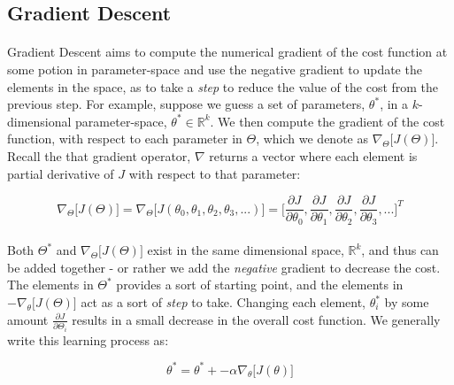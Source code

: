 \documentclass[12pt,letterpaper]{article}
\begin{document}
\subsection{Gradient Descent}

\paragraph*{}Gradient Descent aims to compute the numerical gradient of the cost function at some potion in parameter-space and use the negative gradient to update the elements in the space, as to take a \textit{step} to reduce the value of the cost from the previous step. For example, suppose we guess a set of parameters, $\theta^*$, in a $k$-dimensional parameter-space, $\theta^* \in \mathbb{R}^k$. We then compute the gradient of the cost function, with respect to each parameter in $\Theta$, which we denote as $\nabla_\Theta \big[ J(\Theta) \big]$. Recall the that gradient operator, $\nabla$ returns a vector where each element is partial derivative of $J$ with respect to that parameter:

\begin{equation}
\label{cost gradient}
\nabla_\Theta \big[ J(\Theta) \big] = \nabla_\Theta \big[ J(\theta_0, \theta_1,\theta_2,\theta_3,...) \big] =
\Big[ \frac{\partial J}{\partial \theta_0}, \frac{\partial J}{\partial \theta_1}, 
		\frac{\partial J}{\partial \theta_2}, \frac{\partial J}{\partial \theta_3}, ... \Big]^T
\end{equation}

\paragraph*{}Both $\Theta^*$ and $\nabla_\Theta \big[ J(\Theta) \big]$ exist in the same dimensional space, $\mathbb{R}^k$, and thus can be added together - or rather we add the \textit{negative} gradient to decrease the cost. The elements in $\Theta^*$ provides a sort of starting point, and the elements in $-\nabla_\theta \big[ J(\Theta) \big]$ act as a sort of \textit{step} to take. Changing each element, $\theta^*_i$ by some amount $\frac{\partial J}{\partial \Theta_i}$ results in a small decrease in the overall cost function. We generally write this learning process as:

\begin{equation}
\label{gradient step}
\theta^* = \theta^* + -\alpha \nabla_\theta \big[ J(\theta) \big]
\end{equation}
\end{document}
